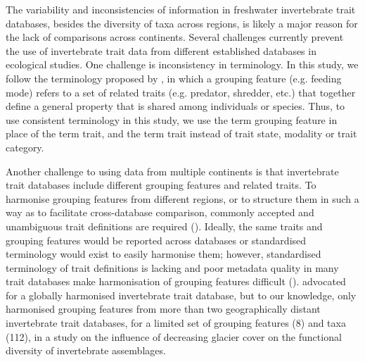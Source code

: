 \documentclass[12pt]{article}
\begin{document}
The variability and inconsistencies of information in freshwater invertebrate trait databases, besides the diversity of taxa across regions, is likely a major reason for the lack of comparisons across continents. Several challenges currently prevent the use of invertebrate trait data from different established databases in ecological studies. One challenge is inconsistency in terminology. In this study, we follow the terminology proposed by \citet{schmera_proposed_2015}, in which a grouping feature (e.g. feeding mode) refers to a set of related traits (e.g. predator, shredder, etc.) that together define a general property that is shared among individuals or species. Thus, to use consistent terminology in this study, we use the term grouping feature in place of the term trait, and the term trait instead of trait state, modality or trait category. 

Another challenge to using data from multiple continents is that invertebrate trait databases include different grouping features and related traits. To harmonise grouping features from different regions, or to structure them in such a way as to facilitate cross-database comparison, commonly accepted and unambiguous trait definitions are required (\cite{schneider_towards_2019}). Ideally, the same traits and grouping features would be reported across databases or standardised terminology would exist to easily harmonise them; however, standardised terminology of trait definitions is lacking and poor metadata quality in many trait databases make harmonisation of grouping features difficult (\cite{baird_toward_2011, kissling_towards_2018}). \citet{maasriGlobalUnifiedTrait2019} advocated for a globally harmonised invertebrate trait database, but to our knowledge, only \citet{brown_functional_2018} harmonised grouping features from more than two geographically distant invertebrate trait databases, for a limited set of grouping features (8) and taxa (112), in a study on the influence of decreasing glacier cover on the functional diversity of invertebrate assemblages.
\end{document}
